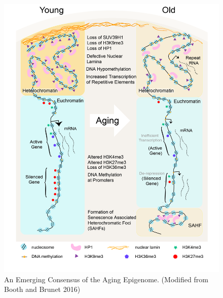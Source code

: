 \documentclass[onehalf,12pt]{beavtex}
\begin{document}
  \begin{figure}
  
  {\centering \includegraphics[width=1\linewidth, ]{./figure/introduction/agingepigenome} 
  
  }
  
  \caption[An Emerging Consensus of the Aging Epigenome]{An Emerging Consensus of the Aging Epigenome.  (Modified from Booth and Brunet 2016)}\label{fig:aging}
  \end{figure}
  
\end{document}

